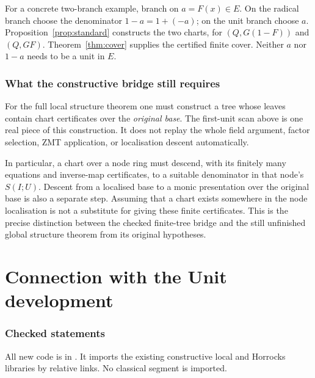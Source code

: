 \documentclass[11pt]{article}
\begin{document}
For a concrete two-branch example, branch on $a=F(x)\in E$.
On the radical branch choose the denominator $1-a=1+(-a)$; on the unit
branch choose $a$. Proposition~\ref{prop:standard} constructs the two
charts, for $(Q,G(1-F))$ and $(Q,GF)$. Theorem~\ref{thm:cover} supplies
the certified finite cover. Neither $a$ nor $1-a$ needs to be a unit
in $E$.

\section{What the constructive bridge still requires}

For the full local structure theorem one must construct a tree whose
leaves contain chart certificates over the \emph{original base}.
The first-unit scan above is one real piece of this construction.
It does not replay the whole field argument, factor selection, ZMT
application, or localisation descent automatically.

In particular, a chart over a node ring must descend, with its finitely
many equations and inverse-map certificates, to a suitable denominator
in that node's $S(I;U)$. Descent from a localised base to a monic
presentation over the original base is also a separate step. Assuming
that a chart exists somewhere in the node localisation is not a
substitute for giving these finite certificates. This is the precise
distinction between the checked finite-tree bridge and the still
unfinished global structure theorem from its original hypotheses.

\part{Connection with the Unit development}

\section{Checked statements}

All new code is in . It imports
the existing constructive local and Horrocks libraries by relative
links. No classical segment is imported.
\end{document}
